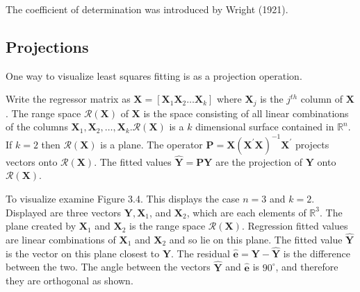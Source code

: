 \documentclass[10pt]{article}
\begin{document}
The coefficient of determination was introduced by Wright (1921).

\subsection{Projections}
One way to visualize least squares fitting is as a projection operation.

Write the regressor matrix as $\boldsymbol{X}=\left[\boldsymbol{X}_{1} \boldsymbol{X}_{2} \ldots \boldsymbol{X}_{k}\right]$ where $\boldsymbol{X}_{j}$ is the $j^{t h}$ column of $\boldsymbol{X}$. The range space $\mathscr{R}(\boldsymbol{X})$ of $\boldsymbol{X}$ is the space consisting of all linear combinations of the columns $\boldsymbol{X}_{1}, \boldsymbol{X}_{2}, \ldots, \boldsymbol{X}_{k} . \mathscr{R}(\boldsymbol{X})$ is a $k$ dimensional surface contained in $\mathbb{R}^{n}$. If $k=2$ then $\mathscr{R}(\boldsymbol{X})$ is a plane. The operator $\boldsymbol{P}=\boldsymbol{X}\left(\boldsymbol{X}^{\prime} \boldsymbol{X}\right)^{-1} \boldsymbol{X}^{\prime}$ projects vectors onto $\mathscr{R}(\boldsymbol{X})$. The fitted values $\widehat{\boldsymbol{Y}}=\boldsymbol{P} \boldsymbol{Y}$ are the projection of $\boldsymbol{Y}$ onto $\mathscr{R}(\boldsymbol{X})$.

To visualize examine Figure 3.4. This displays the case $n=3$ and $k=2$. Displayed are three vectors $\boldsymbol{Y}, \boldsymbol{X}_{1}$, and $\boldsymbol{X}_{2}$, which are each elements of $\mathbb{R}^{3}$. The plane created by $\boldsymbol{X}_{1}$ and $\boldsymbol{X}_{2}$ is the range space $\mathscr{R}(\boldsymbol{X})$. Regression fitted values are linear combinations of $\boldsymbol{X}_{1}$ and $\boldsymbol{X}_{2}$ and so lie on this plane. The fitted value $\widehat{\boldsymbol{Y}}$ is the vector on this plane closest to $\boldsymbol{Y}$. The residual $\widehat{\boldsymbol{e}}=\boldsymbol{Y}-\widehat{\boldsymbol{Y}}$ is the difference between the two. The angle between the vectors $\widehat{\boldsymbol{Y}}$ and $\widehat{\boldsymbol{e}}$ is $90^{\circ}$, and therefore they are orthogonal as shown.
\end{document}
